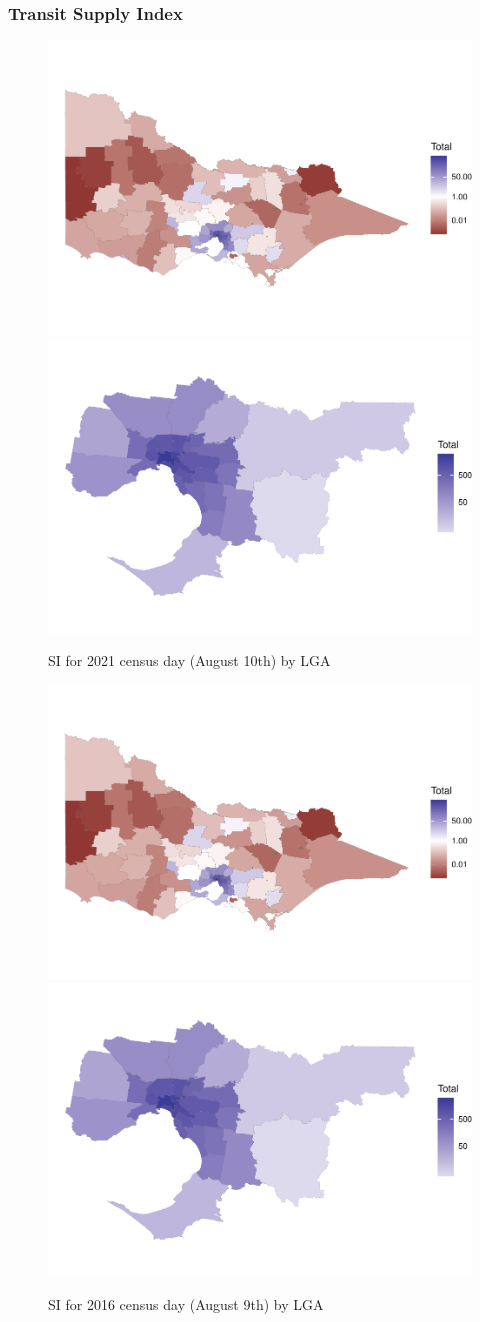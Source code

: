 \documentclass[numbered]{trbunofficial}
\begin{document}
\hypertarget{transit-supply-index}{%
\subsubsection{Transit Supply Index}\label{transit-supply-index}}

\begin{figure}
\includegraphics[width=0.5\linewidth]{Reynolds_Currie_2024_transit_supply_index_GTFS_files/figure-latex/Victoria_SI_2021-1} \includegraphics[width=0.5\linewidth]{Reynolds_Currie_2024_transit_supply_index_GTFS_files/figure-latex/Victoria_SI_2021-2} \caption{SI for 2021 census day (August 10th) by LGA}\label{fig:Victoria_SI_2021}
\end{figure}

\begin{figure}
\includegraphics[width=0.5\linewidth]{Reynolds_Currie_2024_transit_supply_index_GTFS_files/figure-latex/Victoria_SI_2016-1} \includegraphics[width=0.5\linewidth]{Reynolds_Currie_2024_transit_supply_index_GTFS_files/figure-latex/Victoria_SI_2016-2} \caption{SI for 2016 census day (August 9th) by LGA}\label{fig:Victoria_SI_2016}
\end{figure}
\end{document}
